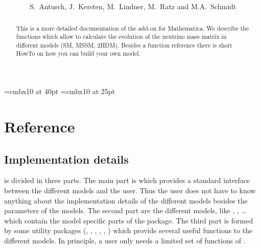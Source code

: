 \documentclass[10pt,a4paper,twoside]{scrartcl}
\begin{document}
\font\TitleFont=cmbx10 at 40pt \font\SubTitleFont=cmbx10 at 25pt
 \title{\\[1cm] } \author{S.~Antusch, J.~Kersten,
M.~Lindner, M.~Ratz and M.A.~Schmidt} \maketitle
\begin{abstract}
  This is a more detailed documentation of the  add-on
  for Mathematica. We describe the functions which allow to calculate the
  evolution of the neutrino mass matrix in different models (SM, MSSM, 2HDM).
  Besides a function reference there is short HowTo on how you can build your
  own model.
\end{abstract}
\thispagestyle{empty}
\tableofcontents
\clearpage










\section{Reference}

\subsection{Implementation details}

 is divided in three parts. The main part
is  which
provides a standard interface between the different models and the user. Thus
the user does not have to know anything about the implementation details of the
different models besides the parameters of the models. 
The second part are the different models, like ,
, \dots which contain the model
specific parts of the package. 
The third part is formed by some utility packages
(, , 
, , , ) which provide several useful functions
to the different models. In principle, a user only needs a limited set of
functions of .
\end{document}
